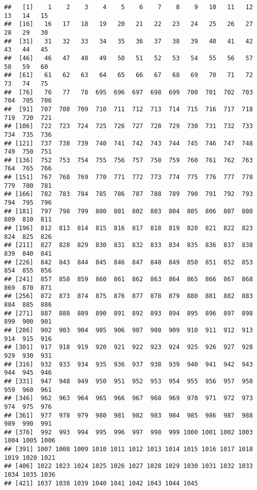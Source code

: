 \documentclass[
]{article}
\begin{document}
\begin{verbatim}
##   [1]    1    2    3    4    5    6    7    8    9   10   11   12   13   14   15
##  [16]   16   17   18   19   20   21   22   23   24   25   26   27   28   29   30
##  [31]   31   32   33   34   35   36   37   38   39   40   41   42   43   44   45
##  [46]   46   47   48   49   50   51   52   53   54   55   56   57   58   59   60
##  [61]   61   62   63   64   65   66   67   68   69   70   71   72   73   74   75
##  [76]   76   77   78  695  696  697  698  699  700  701  702  703  704  705  706
##  [91]  707  708  709  710  711  712  713  714  715  716  717  718  719  720  721
## [106]  722  723  724  725  726  727  728  729  730  731  732  733  734  735  736
## [121]  737  738  739  740  741  742  743  744  745  746  747  748  749  750  751
## [136]  752  753  754  755  756  757  758  759  760  761  762  763  764  765  766
## [151]  767  768  769  770  771  772  773  774  775  776  777  778  779  780  781
## [166]  782  783  784  785  786  787  788  789  790  791  792  793  794  795  796
## [181]  797  798  799  800  801  802  803  804  805  806  807  808  809  810  811
## [196]  812  813  814  815  816  817  818  819  820  821  822  823  824  825  826
## [211]  827  828  829  830  831  832  833  834  835  836  837  838  839  840  841
## [226]  842  843  844  845  846  847  848  849  850  851  852  853  854  855  856
## [241]  857  858  859  860  861  862  863  864  865  866  867  868  869  870  871
## [256]  872  873  874  875  876  877  878  879  880  881  882  883  884  885  886
## [271]  887  888  889  890  891  892  893  894  895  896  897  898  899  900  901
## [286]  902  903  904  905  906  907  908  909  910  911  912  913  914  915  916
## [301]  917  918  919  920  921  922  923  924  925  926  927  928  929  930  931
## [316]  932  933  934  935  936  937  938  939  940  941  942  943  944  945  946
## [331]  947  948  949  950  951  952  953  954  955  956  957  958  959  960  961
## [346]  962  963  964  965  966  967  968  969  970  971  972  973  974  975  976
## [361]  977  978  979  980  981  982  983  984  985  986  987  988  989  990  991
## [376]  992  993  994  995  996  997  998  999 1000 1001 1002 1003 1004 1005 1006
## [391] 1007 1008 1009 1010 1011 1012 1013 1014 1015 1016 1017 1018 1019 1020 1021
## [406] 1022 1023 1024 1025 1026 1027 1028 1029 1030 1031 1032 1033 1034 1035 1036
## [421] 1037 1038 1039 1040 1041 1042 1043 1044 1045
\end{verbatim}
\end{document}
